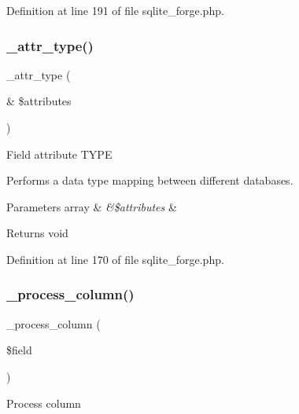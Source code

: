 Definition at line 191 of file sqlite\+\_\+forge.\+php.

\mbox{\label{class_c_i___d_b__sqlite__forge_a8553be952084c6f7cdfff370a1d14f6b}} 
\subsubsection{\texorpdfstring{\_attr\_type()}{\_attr\_type()}}
{\footnotesize\ttfamily \+\_\+attr\+\_\+type (\begin{DoxyParamCaption}\item[{\&}]{\$attributes }\end{DoxyParamCaption})\hspace{0.3cm}{\ttfamily [protected]}}

Field attribute T\+Y\+PE

Performs a data type mapping between different databases.


\begin{DoxyParams}[1]{Parameters}
array & {\em \&\$attributes} & \\
\hline
\end{DoxyParams}
\begin{DoxyReturn}{Returns}
void 
\end{DoxyReturn}


Definition at line 170 of file sqlite\+\_\+forge.\+php.

\mbox{\label{class_c_i___d_b__sqlite__forge_a8f38f1c5b5dddecca4befbe393f3f299}} 
\subsubsection{\texorpdfstring{\_process\_column()}{\_process\_column()}}
{\footnotesize\ttfamily \+\_\+process\+\_\+column (\begin{DoxyParamCaption}\item[{}]{\$field }\end{DoxyParamCaption})\hspace{0.3cm}{\ttfamily [protected]}}

Process column


